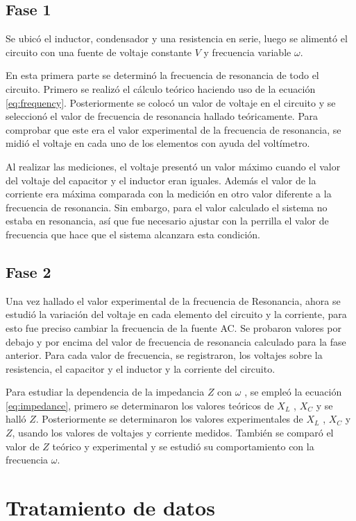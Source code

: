 \documentclass[spanish,notitlepage,letterpaper, 12pt]{article}
\begin{document}
\subsection{Fase 1} \label{M.F1}
Se ubicó el inductor, condensador y una resistencia en serie, luego se alimentó el circuito con una fuente de voltaje constante
$V$ y frecuencia variable $\omega$.\par
\bigskip
En esta primera parte se determinó la frecuencia de resonancia de todo el circuito. Primero se realizó el cálculo teórico haciendo uso de la ecuación \eqref{eq:frequency}.
Posteriormente se colocó un valor de voltaje en el circuito y se seleccionó el
valor de frecuencia de resonancia hallado teóricamente. Para comprobar que
este era el valor experimental de la frecuencia de resonancia, se midió el
voltaje en cada uno de los elementos con ayuda del voltímetro.\par 
\bigskip
Al realizar las
mediciones, el voltaje presentó un valor máximo cuando el valor del
voltaje del capacitor y el inductor eran iguales. Además el valor de la corriente
era máxima comparada con la medición en otro valor diferente a la
frecuencia de resonancia. Sin embargo, para el valor calculado el sistema no
estaba en resonancia, así que fue necesario ajustar con la perrilla el valor de frecuencia que hace que el
sistema alcanzara esta condición.
\subsection{Fase 2} \label{M.F2}
Una vez hallado el valor experimental de la frecuencia de Resonancia,
ahora se estudió la variación del voltaje en cada elemento del circuito y la
corriente, para esto fue preciso cambiar la frecuencia de la fuente AC. Se probaron valores
por debajo y por encima del valor de frecuencia de resonancia calculado para la
fase anterior. Para cada valor de frecuencia, se registraron, los voltajes sobre la resistencia, el capacitor y el inductor y la corriente del circuito.\par 
\bigskip
Para estudiar la
dependencia de la impedancia $Z$ con $\omega$ , se empleó la ecuación \eqref{eq:impedance}, primero se determinaron
los valores teóricos de $X_L$ , $X_C$ y se halló $Z$. Posteriormente se determinaron los valores
experimentales de $X_L$ , $X_C$ y $Z$, usando los valores de voltajes y corriente
medidos. También se comparó el valor de $Z$ teórico y experimental y se estudió su
comportamiento con la frecuencia $\omega$.
\section{Tratamiento de datos} \label{TD}
\end{document}
